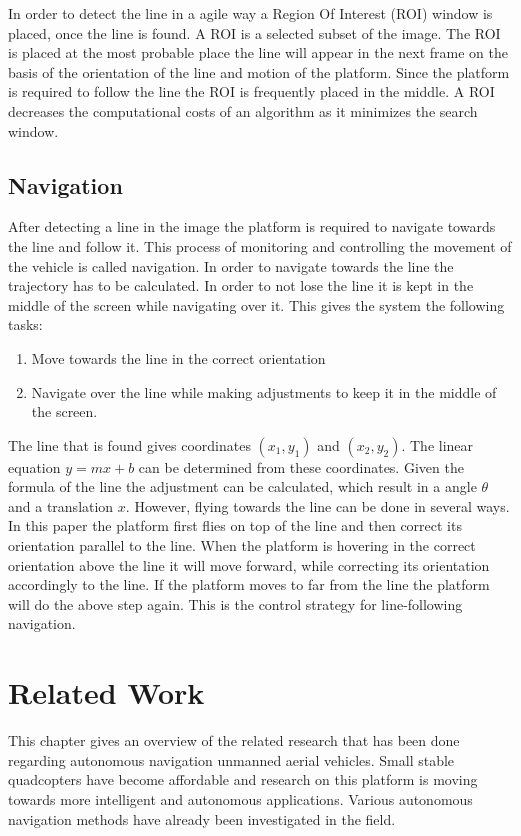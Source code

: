 \documentclass[a4paper]{article}
\begin{document}
In order to detect the line in a agile way a Region Of Interest (ROI) window is placed, once the line is found. A ROI is a selected subset of the image. The ROI is placed at the most probable place the line will appear in the next frame on the basis of the orientation of the line and motion of the platform. Since the platform is required to follow the line the ROI is frequently placed in the middle. A ROI decreases the computational costs of an algorithm as it minimizes the search window.

\subsection{Navigation}
After detecting a line in the image the platform is required to navigate towards the line and follow it. This process of monitoring and controlling the movement of the vehicle is called navigation. In order to navigate towards the line the trajectory has to be calculated. In order to not lose the line it is kept in the middle of the screen while navigating over it. This gives the system the following tasks:
\begin{enumerate}
\item Move towards the line in the correct orientation
\item Navigate over the line while making adjustments to keep it in the middle of the screen.
\end{enumerate}

The line that is found gives coordinates $(x_1, y_1)$ and $(x_2, y_2)$. The linear equation $y = mx + b$ can be determined from these coordinates. Given the formula of the line the adjustment can be calculated, which result in a angle $\theta$ and a translation $x$. However, flying towards the line can be done in several ways. In this paper the platform first flies on top of the line and then correct its orientation parallel to the line. When the platform is hovering in the correct orientation above the line it will move forward, while correcting its orientation accordingly to the line. If the platform moves to far from the line the platform will do the above step again. This is the control strategy for line-following navigation.

\newpage
\section{Related Work}
This chapter gives an overview of the related research that has been done regarding autonomous navigation unmanned aerial vehicles. Small stable quadcopters have become affordable and research on this platform is moving towards more intelligent and autonomous applications. Various autonomous navigation methods have already been investigated in the field.
\end{document}
